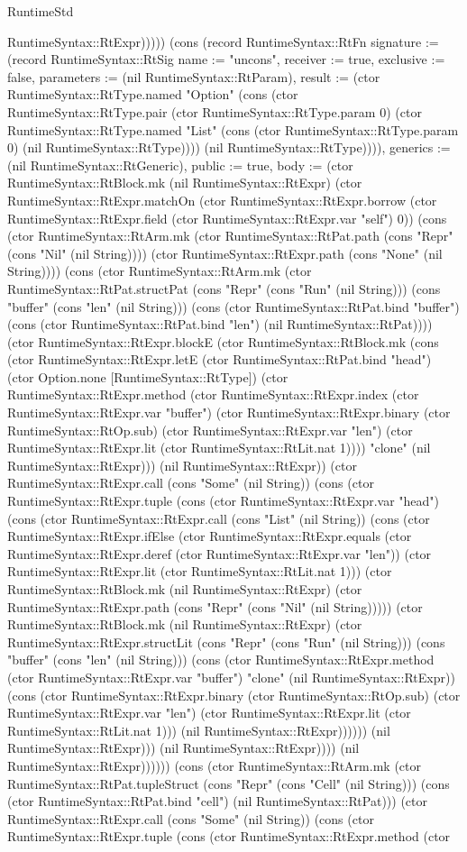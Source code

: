 \begin{lexlean}{RuntimeStd}
\begin{semanticmodule}
{RuntimeSyntax::RtExpr))))}) (cons (record RuntimeSyntax::RtFn {signature := (record RuntimeSyntax::RtSig {name := "uncons", receiver := true, exclusive := false, parameters := (nil RuntimeSyntax::RtParam), result := (ctor RuntimeSyntax::RtType.named "Option" (cons (ctor RuntimeSyntax::RtType.pair (ctor RuntimeSyntax::RtType.param 0) (ctor RuntimeSyntax::RtType.named "List" (cons (ctor RuntimeSyntax::RtType.param 0) (nil RuntimeSyntax::RtType)))) (nil RuntimeSyntax::RtType)))}), generics := (nil RuntimeSyntax::RtGeneric), public := true, body := (ctor RuntimeSyntax::RtBlock.mk (nil RuntimeSyntax::RtExpr) (ctor RuntimeSyntax::RtExpr.matchOn (ctor RuntimeSyntax::RtExpr.borrow (ctor RuntimeSyntax::RtExpr.field (ctor RuntimeSyntax::RtExpr.var "self") 0)) (cons (ctor RuntimeSyntax::RtArm.mk (ctor RuntimeSyntax::RtPat.path (cons "Repr" (cons "Nil" (nil String)))) (ctor RuntimeSyntax::RtExpr.path (cons "None" (nil String)))) (cons (ctor RuntimeSyntax::RtArm.mk (ctor RuntimeSyntax::RtPat.structPat (cons "Repr" (cons "Run" (nil String))) (cons "buffer" (cons "len" (nil String))) (cons (ctor RuntimeSyntax::RtPat.bind "buffer") (cons (ctor RuntimeSyntax::RtPat.bind "len") (nil RuntimeSyntax::RtPat)))) (ctor RuntimeSyntax::RtExpr.blockE (ctor RuntimeSyntax::RtBlock.mk (cons (ctor RuntimeSyntax::RtExpr.letE (ctor RuntimeSyntax::RtPat.bind "head") (ctor Option.none [RuntimeSyntax::RtType]) (ctor RuntimeSyntax::RtExpr.method (ctor RuntimeSyntax::RtExpr.index (ctor RuntimeSyntax::RtExpr.var "buffer") (ctor RuntimeSyntax::RtExpr.binary (ctor RuntimeSyntax::RtOp.sub) (ctor RuntimeSyntax::RtExpr.var "len") (ctor RuntimeSyntax::RtExpr.lit (ctor RuntimeSyntax::RtLit.nat 1)))) "clone" (nil RuntimeSyntax::RtExpr))) (nil RuntimeSyntax::RtExpr)) (ctor RuntimeSyntax::RtExpr.call (cons "Some" (nil String)) (cons (ctor RuntimeSyntax::RtExpr.tuple (cons (ctor RuntimeSyntax::RtExpr.var "head") (cons (ctor RuntimeSyntax::RtExpr.call (cons "List" (nil String)) (cons (ctor RuntimeSyntax::RtExpr.ifElse (ctor RuntimeSyntax::RtExpr.equals (ctor RuntimeSyntax::RtExpr.deref (ctor RuntimeSyntax::RtExpr.var "len")) (ctor RuntimeSyntax::RtExpr.lit (ctor RuntimeSyntax::RtLit.nat 1))) (ctor RuntimeSyntax::RtBlock.mk (nil RuntimeSyntax::RtExpr) (ctor RuntimeSyntax::RtExpr.path (cons "Repr" (cons "Nil" (nil String))))) (ctor RuntimeSyntax::RtBlock.mk (nil RuntimeSyntax::RtExpr) (ctor RuntimeSyntax::RtExpr.structLit (cons "Repr" (cons "Run" (nil String))) (cons "buffer" (cons "len" (nil String))) (cons (ctor RuntimeSyntax::RtExpr.method (ctor RuntimeSyntax::RtExpr.var "buffer") "clone" (nil RuntimeSyntax::RtExpr)) (cons (ctor RuntimeSyntax::RtExpr.binary (ctor RuntimeSyntax::RtOp.sub) (ctor RuntimeSyntax::RtExpr.var "len") (ctor RuntimeSyntax::RtExpr.lit (ctor RuntimeSyntax::RtLit.nat 1))) (nil RuntimeSyntax::RtExpr)))))) (nil RuntimeSyntax::RtExpr))) (nil RuntimeSyntax::RtExpr)))) (nil RuntimeSyntax::RtExpr)))))) (cons (ctor RuntimeSyntax::RtArm.mk (ctor RuntimeSyntax::RtPat.tupleStruct (cons "Repr" (cons "Cell" (nil String))) (cons (ctor RuntimeSyntax::RtPat.bind "cell") (nil RuntimeSyntax::RtPat))) (ctor RuntimeSyntax::RtExpr.call (cons "Some" (nil String)) (cons (ctor RuntimeSyntax::RtExpr.tuple (cons (ctor RuntimeSyntax::RtExpr.method (ctor }
\end{semanticmodule}
\end{lexlean}
